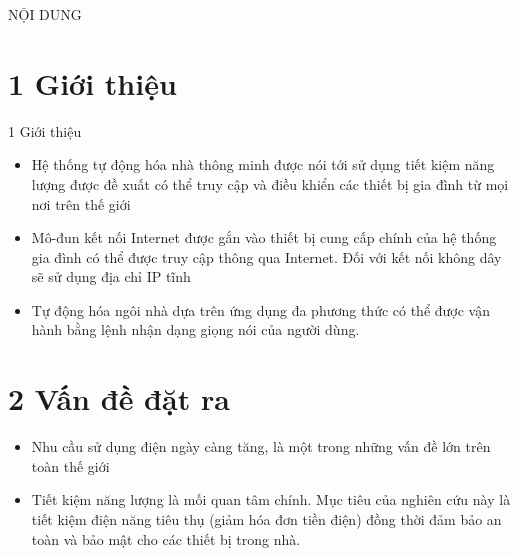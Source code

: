 \documentclass[11pt]{beamer}
\renewcommand{\label}[1]{%
			\gdef\sfname{sf:##1}}%
\begin{document}

\begin{frame}[t]{NỘI DUNG} \vspace{4pt}
	\Large{\tableofcontents}
	
\end{frame}


\section{1 Giới thiệu}
\begin{frame}[c]{1 Giới thiệu}	
	
	\begin{itemize}
		\setlength\itemsep{1.5em}

		\item{Hệ thống tự động hóa nhà thông minh được nói tới sử dụng tiết kiệm năng lượng được đề xuất có thể truy cập và điều khiển các thiết bị gia đình từ mọi nơi trên thế giới}
		
		
		\item{Mô-đun kết nối Internet được gắn vào thiết bị cung cấp chính của hệ thống gia đình có thể được truy cập thông qua Internet. Đối với kết nối không dây sẽ sử dụng địa chỉ IP tĩnh }
		

		\item{Tự động hóa ngôi nhà dựa trên ứng dụng đa phương thức có thể được vận hành bằng lệnh nhận dạng giọng nói của người dùng.}
	\end{itemize}
	
\end{frame}
\section{2 Vấn đề đặt ra}
\label{section2}
\begin{frame}[c]{}
	
	\begin{itemize}
		\setlength\itemsep{2em}
	
		\item{Nhu cầu sử dụng điện ngày càng tăng, là một trong những vấn đề lớn trên toàn thế giới}
	
		\item{Tiết kiệm năng lượng là mối quan tâm chính. Mục tiêu của nghiên cứu này là tiết kiệm điện năng tiêu thụ (giảm hóa đơn tiền điện) đồng thời đảm bảo an toàn và bảo mật cho các thiết bị trong nhà.}

	\end{itemize}

\end{frame}
\end{document}
